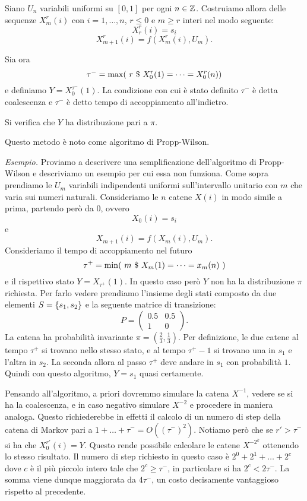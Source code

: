 \documentclass[]{marticle}
\begin{document}
Siano $U_n$ variabili uniformi su $[0,1]$ per ogni $n\in \mathbb{Z}$. Costruiamo allora
delle sequenze $X^r_m(i)$ con $i = 1,\dots,n$, $r\leq 0$ e $m \geq r$ interi nel
modo seguente:
\[
    X^r_r(i) = s_i
\]
\[
    X^r_{m+1}(i) = f(X^r_m(i), U_m).
\]

Sia ora 
\[
    \tau^-=\max(\ r \ \$\  X^r_0(1) = \dots = X^r_0(n))
\]
e definiamo $Y = X^{\tau^-}_0(1)$. La condizione con cui \`e stato definito
$\tau^-$ \`e detta coalescenza e $\tau^-$ \`e detto tempo di accoppiamento
all'indietro.

Si verifica che $Y$ ha distribuzione pari a $\pi$.

Questo metodo \`e noto come algoritmo di Propp-Wilson.

\textit{Esempio.} Proviamo a descrivere una semplificazione dell'algoritmo di
Propp-Wilson e descriviamo un esempio per cui essa non funziona. Come sopra
prendiamo le $U_m$ variabili indipendenti uniformi sull'intervallo unitario con
$m$ che varia sui numeri naturali. Consideriamo le $n$ catene $X(i)$ in modo
simile a prima, partendo per\`o da 0, ovvero
\[
    X_0(i) = s_i
\]
e
\[
    X_{m+1}(i) = f(X_m(i), U_m).
\]
Consideriamo il tempo di accoppiamento nel futuro
\[
    \tau^+ = \min(\ m \st X_m(1) = \dots = x_m(n)\ )
\]
e il rispettivo stato $Y = X_{\tau^+}(1)$. In questo caso per\`o $Y$ non ha la
distribuzione $\pi$ richiesta. 
Per farlo vedere prendiamo l'insieme degli stati composto da due elementi $S =
\{s_1, s_2\}$ e la seguente matrice di transizione:
\[
    P = 
    \begin{pmatrix}
        0.5 & 0.5 \\
        1  & 0
    \end{pmatrix}.
\]
La catena ha probabilit\`a invariante $\pi = (\frac{2}{3}, \frac{1}{3})$. Per
definizione, le due catene al tempo $\tau^+$ si trovano nello stesso stato, e al
tempo $\tau^+-1$ si trovano una in $s_1$ e l'altra in $s_2$. La seconda allora
al passo $\tau^+$ deve andare in $s_1$ con probabilit\`a $1$. Quindi con questo
algoritmo, $Y=s_1$ quasi certamente.

Pensando all'algoritmo, a priori dovremmo simulare la catena $X^{-1}$, vedere se
si ha la coalescenza, e in caso negativo simulare $X^{-2}$ e procedere in
maniera analoga. Questo richiederebbe in effetti il calcolo di un numero di step
della catena di Markov pari a $1+\dots+\tau^- = O((\tau^-)^2)$. Notiamo per\`o
che se $r'>\tau^-$ si ha che $X^{r'}_0(i) = Y$. Questo rende possibile calcolare
le catene $X^{-2^k}$ ottenendo lo stesso risultato. Il numero di step richiesto
in questo caso \`e $2^0+2^1 + \dots + 2^c$ dove $c$ \`e il pi\`u piccolo intero
tale che $2^c \geq \tau^-$, in particolare si ha $2^c < 2\tau^-$. La somma viene
dunque maggiorata da $4\tau^-$, un costo decisamente vantaggioso rispetto al
precedente.
\end{document}
